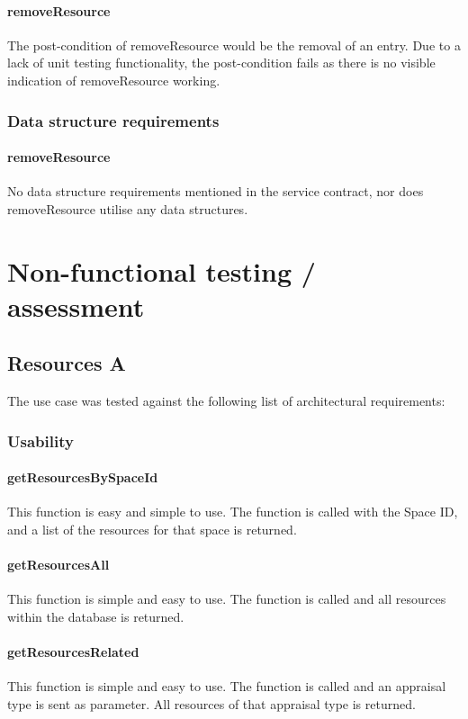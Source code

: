 \documentclass[a4paper]{article}
\begin{document}
\paragraph{removeResource}
The post-condition of removeResource would be the removal of an entry. Due to a lack of unit testing functionality, the post-condition fails as there is no visible indication of removeResource working.

\subsubsection {Data structure requirements}

\paragraph{removeResource}
No data structure requirements mentioned in the service contract, nor does removeResource utilise any data structures.

\section {Non-functional testing / assessment}
\subsection {Resources A}
The use case was tested against the following list of architectural requirements:
\subsubsection {Usability}
\paragraph{getResourcesBySpaceId}
This function is easy and simple to use. The function is called with the Space ID, and a list of the resources for that space is returned.

\paragraph{getResourcesAll}
This function is simple and easy to use. The function is called and all resources within the database is returned.

\paragraph{getResourcesRelated}
This function is simple and easy to use. The function is called and an appraisal type is sent as parameter. All resources of that appraisal type is returned.
\end{document}
